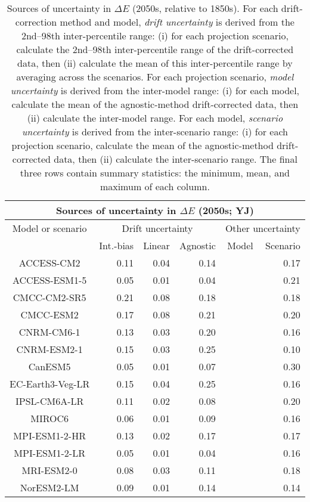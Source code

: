 \begin{table*}[t]
\centering
\caption{Sources of uncertainty in $\Delta E$ (2050s, relative to 1850s). For each drift-correction method and model, \emph{drift uncertainty} is derived from the 2nd--98th inter-percentile range: (i) for each projection scenario, calculate the 2nd--98th inter-percentile range of the drift-corrected data, then (ii) calculate the mean of this inter-percentile range by averaging across the scenarios. For each projection scenario, \emph{model uncertainty} is derived from the inter-model range: (i) for each model, calculate the mean of the agnostic-method drift-corrected data, then (ii) calculate the inter-model range. For each model, \emph{scenario uncertainty} is derived from the inter-scenario range: (i) for each projection scenario, calculate the mean of the agnostic-method drift-corrected data, then (ii) calculate the inter-scenario range. The final three rows contain summary statistics: the minimum, mean, and maximum of each column.}
\begin{tabular}{c|rrr|rr}
\toprule
\multicolumn{6}{c}{Sources of uncertainty in $\Delta E$ (2050s; YJ)} \\ 
\midrule
Model or scenario & \multicolumn{3}{c|}{Drift uncertainty} & \multicolumn{2}{c}{Other uncertainty} \\
 & Int.-bias & Linear & Agnostic & Model & Scenario \\
\midrule
ACCESS-CM2 & 0.11 & 0.04 & 0.14 &  & 0.17 \\
ACCESS-ESM1-5 & 0.05 & 0.01 & 0.04 &  & 0.21 \\
CMCC-CM2-SR5 & 0.21 & 0.08 & 0.18 &  & 0.18 \\
CMCC-ESM2 & 0.17 & 0.08 & 0.21 &  & 0.20 \\
CNRM-CM6-1 & 0.13 & 0.03 & 0.20 &  & 0.16 \\
CNRM-ESM2-1 & 0.15 & 0.03 & 0.25 &  & 0.10 \\
CanESM5 & 0.05 & 0.01 & 0.07 &  & 0.30 \\
EC-Earth3-Veg-LR & 0.15 & 0.04 & 0.25 &  & 0.16 \\
IPSL-CM6A-LR & 0.11 & 0.02 & 0.08 &  & 0.20 \\
MIROC6 & 0.06 & 0.01 & 0.09 &  & 0.16 \\
MPI-ESM1-2-HR & 0.13 & 0.02 & 0.17 &  & 0.17 \\
MPI-ESM1-2-LR & 0.05 & 0.01 & 0.04 &  & 0.16 \\
MRI-ESM2-0 & 0.08 & 0.03 & 0.11 &  & 0.18 \\
NorESM2-LM & 0.09 & 0.01 & 0.14 &  & 0.14 \\

\end{tabular}
\end{table*}
